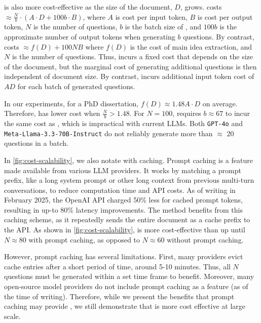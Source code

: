 
\name is also more cost-effective as the size of the document, $D$, grows. \BaselineMT costs $\approx \frac{N}{b} \cdot (A \cdot D + 100b \cdot B)$, where $A$ is cost per input token, $B$ is cost per output token, $N$ is the number of questions, $b$ is the batch size of \BaselineMT, and $100b$ is the approximate number of output tokens when generating $b$ questions. By contrast, \name costs $\approx f(D) + 100NB$ where $f(D)$ is the cost of main idea extraction, and $N$ is the number of questions. Thus, \name incurs a fixed cost that depends on the size of the document, but the marginal cost of generating additional questions is then independent of document size. By contrast, \Baseline incurs additional input token cost of $AD$ for each  batch of generated questions. 

In our experiments, for a PhD dissertation, $f(D) \approx 1.48A \cdot D$ on average.  Therefore, \name has lower cost when $\frac{N}{b} > 1.48$. For $N = 100$, \Baseline requires $b \approx 67$ to incur the same cost as \name, which is impractical with current LLMs. Both \texttt{GPT-4o} and \texttt{Meta-Llama-3.3-70B-Instruct} do not reliably generate more than $\approx$ 20 questions in a batch. 



In \autoref{fig:cost-scalability}, we also notate \BaselineMT with caching. Prompt caching is a feature made available from various LLM providers. It works by matching a prompt prefix, like a long system prompt or other long context from previous multi-turn conversations, to reduce computation time and API costs. As of writing in February 2025, the OpenAI API charged 50\% less for cached prompt tokens, resulting in up-to 80\% latency improvements. The \BaselineMT method benefits from this caching scheme, as it repeatedly sends the entire document as a cache prefix to the API. As shown in \autoref{fig:cost-scalability}, \BaselineMT is more cost-effective than \name up until $N \approx 80$ with prompt caching, as opposed to $N \approx 60$ without prompt caching.

However, prompt caching has several limitations. First, many providers evict cache entries after a short period of time, around 5-10 minutes. Thus, all $N$ questions must be generated within a set time frame to benefit. Moreover, many open-source model providers do not include prompt caching as a feature (as of the time of writing). Therefore, while we present the benefits that prompt caching may provide \BaselineMT, we still demonstrate that \name is more cost effective at large scale.
